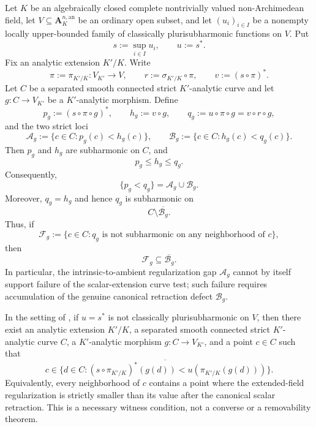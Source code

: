 
\begin{theorem}
\label{thm:p031-curvewise-scalar-defect-localization}
Let $K$ be an algebraically closed complete nontrivially valued
non-Archimedean field, let
$V\subseteq\mathbf A_K^{n,\mathrm{an}}$ be an ordinary open subset, and
let $(u_i)_{i\in I}$ be a nonempty locally upper-bounded family of
classically plurisubharmonic functions on $V$.  Put
\[
                         s:=\sup_{i\in I}u_i,
                    \qquad u:=s^*.
\]
Fix an analytic extension $K'/K$.  Write
\[
 \pi:=\pi_{K'/K}:V_{K'}\longrightarrow V,
 \qquad r:=\sigma_{K'/K}\circ\pi,
 \qquad v:=(s\circ\pi)^*.
\]
Let $C$ be a separated smooth connected strict $K'$-analytic curve and
let $g:C\to V_{K'}$ be a $K'$-analytic morphism.  Define
\[
 p_g:=(s\circ\pi\circ g)^*,
 \qquad h_g:=v\circ g,
 \qquad q_g:=u\circ\pi\circ g=v\circ r\circ g,
\]
and the two strict loci
\[
 \mathcal A_g:=\{c\in C:p_g(c)<h_g(c)\},
 \qquad
 \mathcal B_g:=\{c\in C:h_g(c)<q_g(c)\}.
\]
Then $p_g$ and $h_g$ are subharmonic on $C$, and
\begin{equation}
\label{eq:p031-curvewise-scalar-defect-chain}
                              p_g\leq h_g\leq q_g.
\end{equation}
Consequently,
\begin{equation}
\label{eq:p031-curvewise-total-defect-splitting}
                  \{p_g<q_g\}=\mathcal A_g\cup\mathcal B_g.
\end{equation}
Moreover, $q_g=h_g$ and hence $q_g$ is subharmonic on
\begin{equation}
\label{eq:p031-curvewise-scalar-good-locus}
                              C\setminus\overline{\mathcal B_g}.
\end{equation}
Thus, if
\[
 \mathcal F_g:=
 \{c\in C:q_g\text{ is not subharmonic on any neighborhood of }c\},
\]
then
\begin{equation}
\label{eq:p031-curvewise-failure-contained-in-scalar-defect}
                         \mathcal F_g\subseteq\overline{\mathcal B_g}.
\end{equation}
In particular, the intrinsic-to-ambient regularization gap
$\mathcal A_g$ cannot by itself support failure of the scalar-extension
curve test; such failure requires accumulation of the genuine canonical
retraction defect $\mathcal B_g$.
\end{theorem}

\begin{corollary}
\label{cor:p031-scalar-defect-curve-witness}
In the setting of
, if $u=s^*$ is not
classically plurisubharmonic on $V$, then there exist an analytic extension
$K'/K$, a separated smooth connected strict $K'$-analytic curve $C$, a
$K'$-analytic morphism $g:C\to V_{K'}$, and a point $c\in C$ such that
\[
 c\in\overline{
   \{d\in C:
      (s\circ\pi_{K'/K})^*(g(d))
       <u(\pi_{K'/K}(g(d)))\}
 }.
\]
Equivalently, every neighborhood of $c$ contains a point where the
extended-field regularization is strictly smaller than its value after the
canonical scalar retraction.  This is a necessary witness condition, not a
converse or a removability theorem.
\end{corollary}
